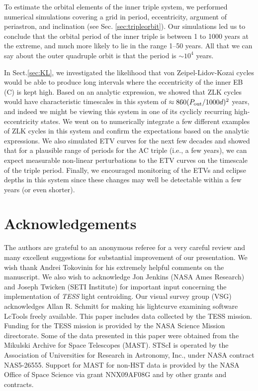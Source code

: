 \documentclass[fleqn,usenatbib]{mnras} %
\begin{document}
To estimate the orbital elements of the inner triple system, we performed numerical simulations covering a grid in period, eccentricity, argument of periastron, and inclination (see Sec. \ref{sec:tripleorbit}). Our simulations led us to conclude that the orbital period of the inner triple is between 1 to 1000 years at the extreme, and much more likely to lie in the range 1--50 years.  All that we can say about the outer quadruple orbit is that the period is $\sim10^4$ years.

In Sect.\ref{sec:KL}, we investigated the likelihood that von Zeipel-Lidov-Kozai cycles would be able to produce long intervals where the eccentricity of the inner EB (C) is kept high.  Based on an analytic expression, we showed that ZLK cycles would have characteristic timescales in this system of $\approx 860 (P_{\rm out}/1000 d)^2$ years, and indeed we might be viewing this system in one of its cyclicly recurring high-eccentricity states. We went on to numerically integrate a few different examples of ZLK cycles in this system and confirm the expectations based on the analytic expressions.  We also simulated ETV curves for the next few decades and showed that for a plausible range of periods for the AC triple (i.e., a few years), we can expect measurable non-linear perturbations to the ETV curves on the timescale of the triple period.  Finally, we encouraged monitoring of the ETVs and eclipse depths in this system since these changes may well be detectable within a few years (or even shorter).

\section*{Acknowledgements}
The authors are grateful to an anonymous referee for a very careful review and many excellent suggestions for substantial improvement of our presentation.
We wish thank Andrei Tokovinin for his extremely helpful comments on the manuscript.
We also wish to acknowledge Jon Jenkins (NASA Ames Research) and Joseph Twicken (SETI Institute) for important input concerning the implementation of {\em TESS} light centroiding.
Our visual survey group (VSG) acknowledges Allan R. Schmitt for making his lightcurve examining software LcTools freely available.
This paper includes data collected by the TESS mission. Funding for the TESS mission is provided by the NASA Science Mission directorate. Some of the data presented in this paper were obtained from the Mikulski Archive for Space Telescopes (MAST). STScI is operated by the Association of Universities for Research in Astronomy, Inc., under NASA contract NAS5-26555. Support for MAST for non-HST data is provided by the NASA Office of Space Science via grant NNX09AF08G and by other grants and contracts.
\end{document}
